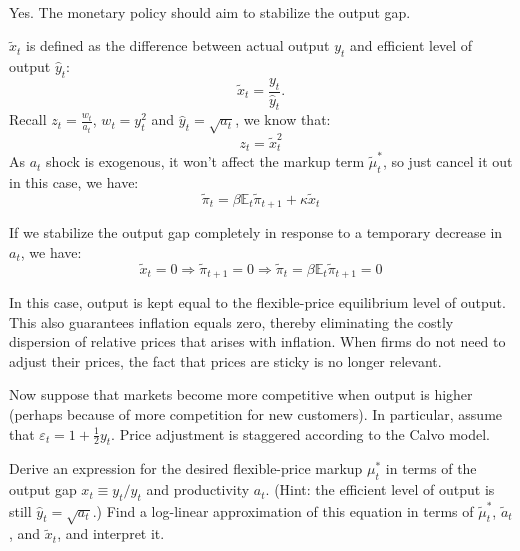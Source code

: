 \begin{solution}
    \

    Yes. The monetary policy should aim to stabilize the output gap.

    $\tilde{x}_t$ is defined as the difference between actual output $y_t$ and efficient level of output $\hat{y}_t$:
    \[\tilde{x}_t = \frac{y_t}{\hat{y}_t}.\]
    Recall $z_t = \frac{w_t}{a_t}$, $w_t = y_t^2$ and $\hat{y}_t = \sqrt{a_t} $,
    we know that:
    \[z_t = \tilde{x}_t^2\]
    As $a_t$ shock is exogenous, it won't affect the markup term $\tilde{\mu}_t^*$, so just cancel it out in
    this case, we have:
    \[\tilde{\pi}_t = \beta \mathbb{E}_t \tilde{\pi}_{t+1} + \kappa \tilde{x}_t \]
    
    If we stabilize the output gap completely in response to a temporary decrease in $a_t$, we have:
    \[\tilde{x}_t = 0 \Rightarrow \tilde{\pi}_{t+1} = 0 \Rightarrow \tilde{\pi}_t = \beta \mathbb{E}_t \tilde{\pi }_{t+1} = 0\]
    
    In this case, output is kept equal to the flexible-price equilibrium level of output. 
    This also guarantees inflation equals zero, thereby eliminating the costly dispersion of relative prices that arises with inflation. 
    When firms do not need to adjust their prices, the fact that prices are sticky is no longer relevant. 

\end{solution}

Now suppose that markets become more competitive when output is higher (perhaps because of
more competition for new customers). In particular, assume that $\varepsilon_t = 1 + \frac{1}{2}y_t$. Price adjustment is
staggered according to the Calvo model.

\begin{problem*}[d]
    Derive an expression for the desired flexible-price markup $\mu_t^*$ in terms of the output gap $x_t \equiv y_t / \hat{y}_t$ and productivity $a_t$. 
    (Hint: the efficient level of output is still $\hat{y}_t = \sqrt{a_t}$.) 
    Find a log-linear approximation of this equation in terms of $\tilde{\mu}_t^*$, $\tilde{a}_t$, 
    and $\tilde{x}_t$, and interpret it.
\end{problem*}

